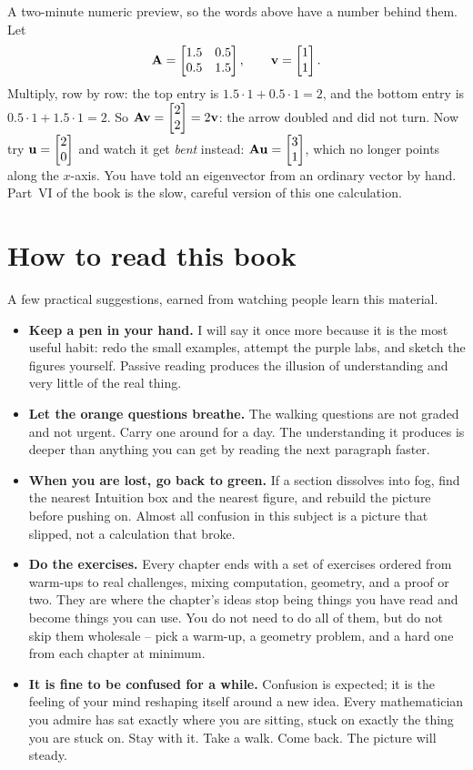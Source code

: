 \begin{labbox}
A two-minute numeric preview, so the words above have a number behind them. Let
\[
\mathbf{A}=\begin{bmatrix}1.5 & 0.5 \\ 0.5 & 1.5\end{bmatrix}, \qquad \mathbf{v}=\begin{bmatrix}1\\1\end{bmatrix}.
\]
Multiply,
row by row: the top entry is $1.5\cdot 1 + 0.5\cdot 1 = 2$, and the bottom entry
is $0.5\cdot 1 + 1.5\cdot 1 = 2$. So $\mathbf{A}\mathbf{v}=\begin{bmatrix}2\\2\end{bmatrix}=2\mathbf{v}$: the
arrow doubled and did not turn. Now try $\mathbf{u}=\begin{bmatrix}2\\0\end{bmatrix}$ and watch it get
\emph{bent} instead: $\mathbf{A}\mathbf{u}=\begin{bmatrix}3\\1\end{bmatrix}$, which no longer points along
the $x$-axis. You have told an eigenvector from an ordinary vector by hand.
Part~VI of the book is the slow, careful version of this one calculation.
\end{labbox}

\section*{How to read this book}

A few practical suggestions, earned from watching people learn this material.

\begin{itemize}
\item \textbf{Keep a pen in your hand.} I will say it once more because it is the
most useful habit: redo the small examples, attempt the purple labs,
and sketch the figures yourself. Passive reading produces the illusion of
understanding and very little of the real thing.

\item \textbf{Let the orange questions breathe.} The walking questions are not
graded and not urgent. Carry one around for a day. The understanding it produces
is deeper than anything you can get by reading the next paragraph faster.

\item \textbf{When you are lost, go back to green.} If a section dissolves into
fog, find the nearest Intuition box and the nearest figure, and rebuild the
picture before pushing on. Almost all confusion in this subject is a picture that
slipped, not a calculation that broke.

\item \textbf{Do the exercises.} Every chapter ends with a set of exercises
ordered from warm-ups to real challenges, mixing computation, geometry, and a proof or two.
They are where the chapter's ideas stop being things you have read and become
things you can use. You do not need to do all of them, but do not skip them
wholesale -- pick a warm-up, a geometry problem, and a hard one from each
chapter at minimum.

\item \textbf{It is fine to be confused for a while.} Confusion is expected;
it is the feeling of your mind reshaping itself around a new idea.
Every mathematician you admire has sat exactly where you are sitting, stuck on
exactly the thing you are stuck on. Stay with it. Take a walk. Come back. The
picture will steady.
\end{itemize}

